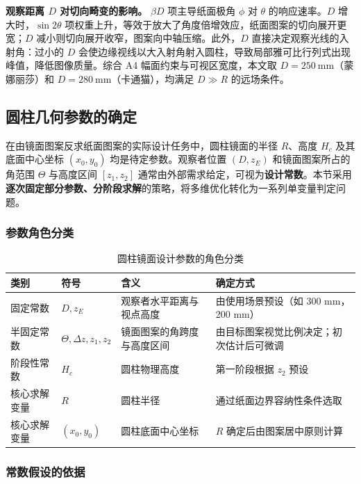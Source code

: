 \documentclass[12pt, a4paper]{ctexart}
\begin{document}
\textbf{观察距离 $D$ 对切向畸变的影响。}
$\beta D$ 项主导纸面极角 $\phi$ 对 $\theta$ 的响应速率。$D$ 增大时，$\sin2\theta$ 项权重上升，等效于放大了角度倍增效应，纸面图案的切向展开更宽；$D$ 减小则切向展开收窄，图案向中轴压缩。此外，$D$ 直接决定观察光线的入射角：过小的 $D$ 会使边缘视线以大入射角射入圆柱，导致局部雅可比行列式出现峰值，降低图像质量。综合 A4 幅面约束与可视区宽度，本文取 $D=250\ \mathrm{mm}$（蒙娜丽莎）和 $D=280\ \mathrm{mm}$（卡通猫），均满足 $D\gg R$ 的远场条件。

\subsection{圆柱几何参数的确定}

在由镜面图案反求纸面图案的实际设计任务中，圆柱镜面的半径 $R$、高度 $H_c$ 及其底面中心坐标 $(x_0,y_0)$ 均是待定参数。观察者位置 $(D,z_E)$ 和镜面图案所占的角范围 $\Theta$ 与高度区间 $[z_1,z_2]$ 通常由外部需求给定，可视为\textbf{设计常数}。本节采用\textbf{逐次固定部分参数、分阶段求解}的策略，将多维优化转化为一系列单变量判定问题。

\subsubsection{参数角色分类}

\begin{table}[htbp]
\centering
\caption{圆柱镜面设计参数的角色分类}
\label{tab:param-roles}
\begin{tabularx}{\textwidth}{lllX}
\toprule
\textbf{类别} & \textbf{符号} & \textbf{含义} & \textbf{确定方式} \\
\midrule
固定常数 & $D,z_E$ & 观察者水平距离与视点高度 & 由使用场景预设（如 300 mm，200 mm） \\
半固定常数 & $\Theta,\Delta z,z_1,z_2$ & 镜面图案的角跨度与高度区间 & 由目标图案视觉比例决定；初次估计后可微调 \\
阶段性常数 & $H_c$ & 圆柱物理高度 & 第一阶段根据 $z_2$ 预设 \\
核心求解变量 & $R$ & 圆柱半径 & 通过纸面边界容纳性条件选取 \\
核心求解变量 & $(x_0,y_0)$ & 圆柱底面中心坐标 & $R$ 确定后由图案居中原则计算 \\
\bottomrule
\end{tabularx}
\end{table}

\subsubsection{常数假设的依据}
\end{document}
